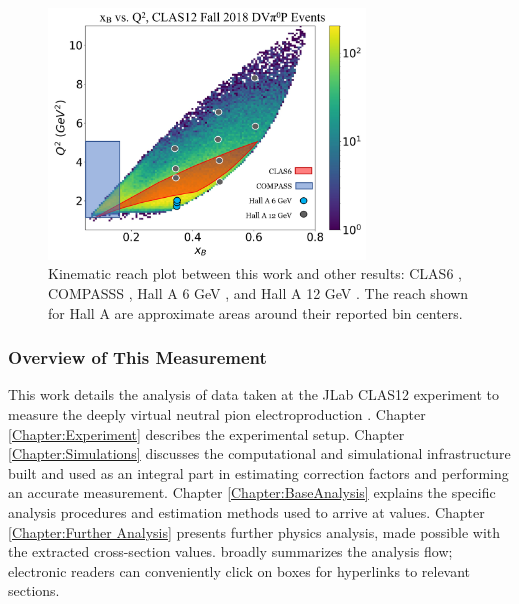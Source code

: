      
        \begin{figure}[H]
            \centering
            \includegraphics[width=0.75\textwidth]{Chapters/Ch1-Intro/Ch1-Sec2-GPDs-DVMP/pics/kinematic_overlap.png}
            \caption[Kinematic Reach Comparison]{Kinematic reach plot between this work and other results:  CLAS6 \parencite{Bedlinskiy2014ExclusiveCLAS}, COMPASSS \parencite{Alexeev2020MeasurementProton}, Hall A 6 GeV \parencite{Fuchey2011ExclusiveRegime}, and Hall A 12 GeV \parencite{Dlamini2021DeepRegime}. The reach shown for Hall A are approximate areas around their reported bin centers. }
            \label{fig:kinematicreach}
        \end{figure}

        \subsubsection*{Overview of This Measurement}\label{sec:anaflow}
    
    
        This work details the analysis of data taken at the JLab CLAS12 experiment to measure the deeply virtual neutral pion electroproduction \xsec. Chapter \ref{Chapter:Experiment} describes the experimental setup. Chapter \ref{Chapter:Simulations} discusses the computational and simulational infrastructure built and used as an integral part in estimating correction factors and performing an accurate measurement. Chapter \ref{Chapter:BaseAnalysis} explains the specific analysis procedures and estimation methods used to arrive at \xsec values. Chapter \ref{Chapter:Further Analysis} presents further physics analysis, made possible with the extracted cross-section values.  broadly summarizes the analysis flow; electronic readers can conveniently click on boxes for hyperlinks to relevant sections. 
         
